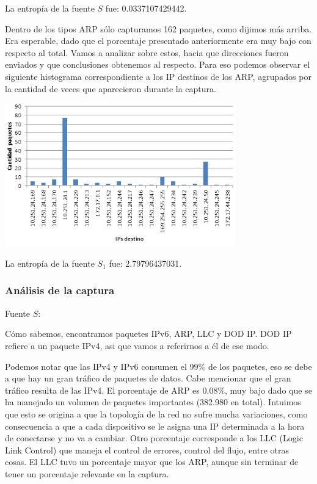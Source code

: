 La entrop\'ia de la fuente $S$ fue: 0.0337107429442.\newline

Dentro de los tipos ARP s\'olo capturamos 162 paquetes, como dijimos m\'as arriba. Era esperable, dado que el porcentaje presentado anteriormente era muy bajo con respecto al total. \newline
Vamos a analizar sobre estos, hacia que direcciones fueron enviados y que conclusiones obtenemos al respecto. Para eso podemos observar el siguiente histograma correspondiente a los IP destinos de los ARP, agrupados por la cantidad de veces que aparecieron durante la captura.

\begin{center}
\includegraphics[width=0.75\textwidth]{exp1-graficos/grafico2exp1.png}
\end{center}

La entrop\'ia de la fuente $S_1$ fue: 2.79796437031.


\subsubsection{An\'alisis de la captura}

Fuente $S$:\newline

C\'omo sabemos, encontramos paquetes IPv6, ARP, LLC y DOD IP. DOD IP refiere a un paquete IPv4, asi que vamos a referirnos a \'el de ese modo.\newline

Podemos notar que las IPv4 y IPv6 consumen el 99\% de los paquetes, eso se debe a que hay un gran tr\'afico de paquetes de datos. Cabe mencionar que el gran tr\'afico resulta de las IPv4. \newline
El porcentaje de ARP es 0.08\%, muy bajo dado que se ha manejado un volumen de paquetes importantes (382.980 en total). Intuimos que esto se origina a que la topología de la red no sufre mucha variaciones, como consecuencia a que a cada dispositivo se le asigna una IP determinada a la hora de conectarse y no va a cambiar. \newline
Otro porcentaje corresponde a los LLC (Logic Link Control) que maneja el control de errores, control del flujo, entre otras cosas. El LLC tuvo un porcentaje mayor que los ARP, aunque sin terminar de tener un porcentaje relevante en la captura.\newline

